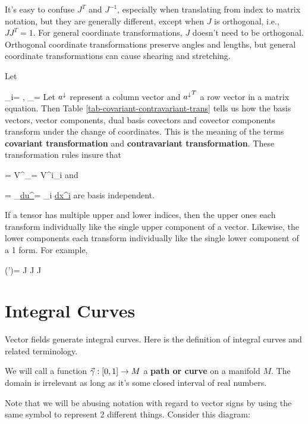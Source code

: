 It's easy to confuse $J^T$ and $J^{-1}$, especially when translating from index to matrix notation, but they are generally different, except when $J$ 
is orthogonal, i.e., $J J^T=1$. For general coordinate
transformations, $J$ doesn't need to be orthogonal. Orthogonal coordinate transformations preserve angles and lengths,
but general coordinate transformations can
cause shearing and stretching. 

Let

\beq
\vecpartial_i= 
,
\quad 
\vecpartial_{\mu}= 
\eeq
Let ${a^\downarrow}$ represent a column vector
and ${a^\downarrow}^T$ a row vector in a matrix equation.
Then Table 
\ref{tab-covariant-contravariant-trans}
tells us how
the basis vectors, vector components,
dual basis covectors
and covector
components transform
under the change 
of coordinates.
This is the meaning of the terms {\bf covariant transformation}  and {\bf contravariant transformation}.
These 
transformation rules  insure that

\beq
\vecV=
V^\mu\vecpartial_\mu= V^i\vecpartial_i
\eeq
and

\beq
\ul{\omega}=
\omega_\mu \ul{du^\mu}=
\omega_i \ul{dx^i}
\eeq
are basis independent.

If a tensor has multiple upper and lower indices, then the upper ones each transform individually
like the single upper component of a vector.
Likewise, the lower components each transform individually like the single lower component of a 1 form. For example,

\beq
(\TT\;')\indices{^\alp^\beta_\mu}=
J
 J
\TT{} J
\eeq



\section{Integral Curves}
\label{sec-integral-curves}

Vector fields generate integral curves.
Here is the definition of integral curves and related terminology.


We will call a function  ${\vec{\gamma}}: [0, 1]\rightarrow M$
a {\bf path or curve} on
a manifold $M$. The domain 
is irrelevant 
as long as it's some closed 
interval of real numbers.

Note 
that we will be abusing  notation
with regard to vector signs
by using the
same symbol to represent 2 different things. 
Consider this diagram:

